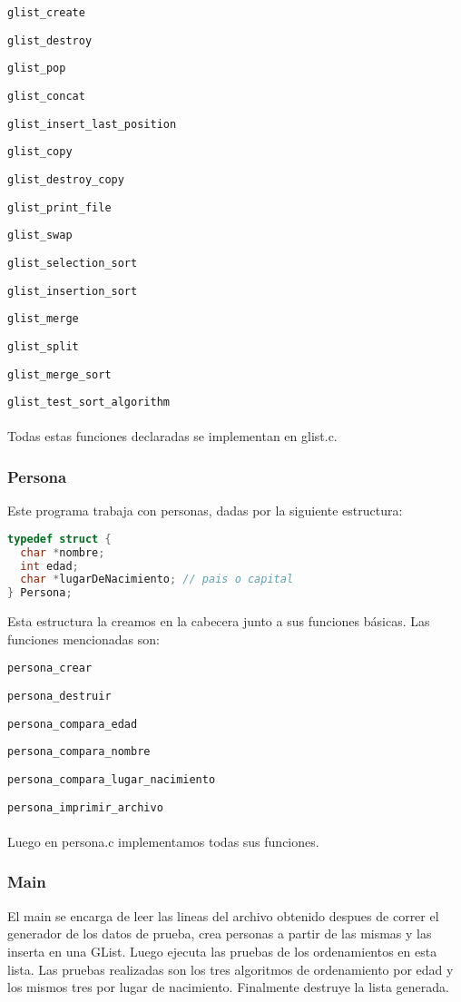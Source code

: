 \documentclass[]{article}
\begin{document}
\verb|glist_create|

\verb|glist_destroy|

\verb|glist_pop|

\verb|glist_concat|

\verb|glist_insert_last_position|

\verb|glist_copy|

\verb|glist_destroy_copy|

\verb|glist_print_file|

\verb|glist_swap|

\verb|glist_selection_sort|

\verb|glist_insertion_sort|

\verb|glist_merge|

\verb|glist_split|

\verb|glist_merge_sort|

\verb|glist_test_sort_algorithm|\\\\
Todas estas funciones declaradas se implementan en glist.c.
\subsubsection{Persona}
Este programa trabaja con personas, dadas por la siguiente estructura:
\begin{lstlisting}[language=C]
typedef struct {
  char *nombre;
  int edad;
  char *lugarDeNacimiento; // pais o capital
} Persona;
\end{lstlisting}
Esta estructura la creamos en la cabecera junto a sus funciones básicas.
Las funciones mencionadas son:

\verb|persona_crear|

\verb|persona_destruir|

\verb|persona_compara_edad|

\verb|persona_compara_nombre|

\verb|persona_compara_lugar_nacimiento|

\verb|persona_imprimir_archivo|\\\\
Luego en persona.c implementamos todas sus funciones.
\subsubsection{Main}
El main se encarga de leer las lineas del archivo obtenido despues de correr el generador de los datos de prueba, crea personas a partir de las mismas y las inserta en una GList.
Luego ejecuta las pruebas de los ordenamientos en esta lista. Las pruebas realizadas son los tres algoritmos de ordenamiento por edad y los mismos tres por lugar de nacimiento. Finalmente destruye la lista generada.
\end{document}
